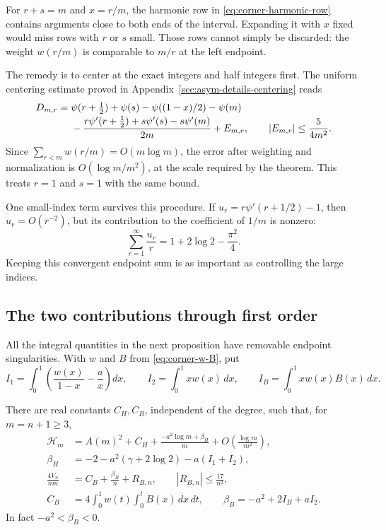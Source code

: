 For $r+s=m$ and $x=r/m$, the harmonic row in
\eqref{eq:corner-harmonic-row} contains arguments close to both ends
of the interval.  Expanding it with $x$ fixed would miss rows with
$r$ or $s$ small.  Those rows cannot simply be discarded: the weight
$w(r/m)$ is comparable to $m/r$ at the left endpoint.

The remedy is to center at the exact integers and half integers first.
The uniform centering estimate proved in
Appendix~\ref{sec:asym-details-centering} reads
\begin{align}
 D_{m,r}={}&\psi(r+\tfrac12)+\psi(s)-\psi((1-x)/2)-\psi(m)
      \notag\\[-2pt]
 &-\frac{r\psi'(r+\tfrac12)+s\psi'(s)-s\psi'(m)}{2m}
      +E_{m,r},
 \qquad |E_{m,r}|\leq\frac{5}{4m^2}.
 \label{eq:asym-uniform-centering}
\end{align}
Since $\sum_{r<m}w(r/m)=O(m\log m)$, the error after weighting
and normalization is $O(\log m/m^2)$, at the scale required by the
theorem.  This treats $r=1$ and $s=1$ with the same bound.

One small-index term survives this procedure.  If
$u_r=r\psi'(r+1/2)-1$, then $u_r=O(r^{-2})$, but its contribution
to the coefficient of $1/m$ is nonzero:
\begin{equation}\label{eq:asym-small-index-sum}
 \sum_{r=1}^\infty\frac{u_r}{r}
       =1+2\log2-\frac{\pi^2}{4}.
\end{equation}
Keeping this convergent endpoint sum is as important as controlling
the large indices.

\subsection{The two contributions through first order}

All the integral quantities in the next proposition have removable
endpoint singularities.  With $w$ and $B$ from
\eqref{eq:corner-w-B}, put
\begin{equation}\label{eq:asym-integrals}
 I_1=\int_0^1\left(\frac{w(x)}{1-x}-\frac ax\right)dx,
 \qquad I_2=\int_0^1xw(x)\,dx,
 \qquad I_B=\int_0^1xw(x)B(x)\,dx.
\end{equation}

\begin{proposition}
\label{prop:asym-two-expansions}
There are real constants $C_H,C_B$, independent of the degree, such
that, for $m=n+1\geq3$,
\begin{align}
 \mathcal H_m
   &=A(m)^2+C_H+\frac{-a^2\log m+\beta_H}{m}
                    +O\!\left(\frac{\log m}{m^2}\right),
                    \label{eq:asym-harmonic-expansion}\\
 \beta_H&=-2-a^2(\gamma+2\log2)-a(I_1+I_2),
                    \label{eq:asym-beta-H}\\
 \frac{4V_n}{nm}
   &=C_B+\frac{\beta_B}{n}+R_{B,n},\qquad
          |R_{B,n}|\leq\frac{17}{n^2},
                    \label{eq:asym-smooth-expansion}\\
 C_B&=4\int_0^1w(t)\int_0^tB(x)\,dx\,dt,
 \qquad \beta_B=-a^2+2I_B+aI_2.
                    \label{eq:asym-beta-B}
\end{align}
In fact $-a^2<\beta_B<0$.
\end{proposition}

